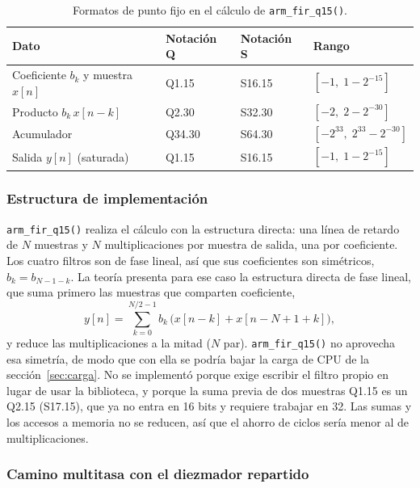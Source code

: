 \documentclass[11pt,a4paper]{article}
\begin{document}
\begin{table}[H]
\centering
\caption{Formatos de punto fijo en el cálculo de \texttt{arm\_fir\_q15()}.}
\label{tab:formatos}
\begin{tabular}{@{}l l l l@{}}
\toprule
\textbf{Dato} & \textbf{Notación Q} & \textbf{Notación S} & \textbf{Rango}\\
\midrule
Coeficiente $b_k$ y muestra $x[n]$ & Q1.15  & S16.15 & $[-1,\; 1 - 2^{-15}]$\\
Producto $b_k\,x[n-k]$            & Q2.30  & S32.30 & $[-2,\; 2 - 2^{-30}]$\\
Acumulador                        & Q34.30 & S64.30 & $[-2^{33},\; 2^{33} - 2^{-30}]$\\
Salida $y[n]$ (saturada)          & Q1.15  & S16.15 & $[-1,\; 1 - 2^{-15}]$\\
\bottomrule
\end{tabular}
\end{table}

\subsubsection{Estructura de implementación}

\texttt{arm\_fir\_q15()} realiza el cálculo con la estructura directa: una
línea de retardo de $N$ muestras y $N$ multiplicaciones por muestra de salida,
una por coeficiente. Los cuatro filtros son de fase lineal, así que sus
coeficientes son simétricos, $b_k = b_{N-1-k}$. La teoría presenta para ese
caso la estructura directa de fase lineal, que suma primero las muestras que
comparten coeficiente,
\begin{equation}
  y[n] = \sum_{k=0}^{N/2-1} b_k\,\bigl(x[n-k] + x[n-N+1+k]\bigr),
\end{equation}
y reduce las multiplicaciones a la mitad ($N$ par). \texttt{arm\_fir\_q15()}
no aprovecha esa simetría, de modo que con ella se podría bajar la carga de
CPU de la sección~\ref{sec:carga}. No se implementó porque exige escribir el
filtro propio en lugar de usar la biblioteca, y porque la suma previa de dos
muestras Q1.15 es un Q2.15 (S17.15), que ya no entra en 16 bits y requiere
trabajar en 32. Las
sumas y los accesos a memoria no se reducen, así que el ahorro de ciclos
sería menor al de multiplicaciones.

\subsubsection{Camino multitasa con el diezmador repartido}\label{sec:camino}
\end{document}
